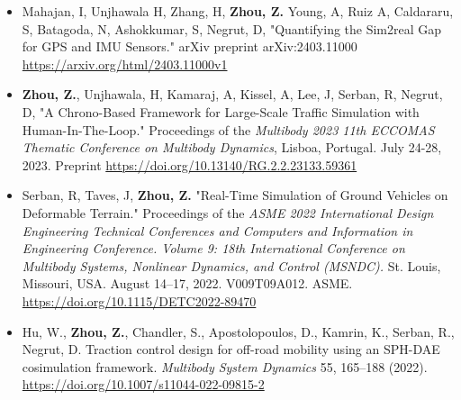 



\begin{footnotesize}

\begin{itemize}[leftmargin=2ex, nosep, noitemsep]
	\item {Mahajan, I, Unjhawala H, Zhang, H, \textbf{Zhou, Z.} Young, A, Ruiz A, Caldararu, S, Batagoda, N, Ashokkumar, S, Negrut, D,  "Quantifying the Sim2real Gap for GPS and IMU Sensors." arXiv preprint arXiv:2403.11000 \url{https://arxiv.org/html/2403.11000v1}}
	
	
	\item {\textbf{Zhou, Z.}, Unjhawala, H, Kamaraj, A, Kissel, A, Lee, J, Serban, R, Negrut, D,  "A Chrono-Based Framework for Large-Scale Traffic Simulation with Human-In-The-Loop." Proceedings of the \textit {Multibody 2023 11th ECCOMAS Thematic Conference on Multibody Dynamics}, Lisboa, Portugal. July 24-28, 2023. Preprint \url{https://doi.org/10.13140/RG.2.2.23133.59361}}
	
	
	\item {Serban, R, Taves, J, \textbf{Zhou, Z.} "Real-Time Simulation of Ground Vehicles on Deformable Terrain." Proceedings of the \textit {ASME 2022 International Design Engineering Technical Conferences and Computers and Information in Engineering Conference. Volume 9: 18th International Conference on Multibody Systems, Nonlinear Dynamics, and Control (MSNDC).} St. Louis, Missouri, USA. August 14–17, 2022. V009T09A012. ASME. \url{https://doi.org/10.1115/DETC2022-89470}}
	
	
	\item {Hu, W., \textbf{Zhou, Z.}, Chandler, S., Apostolopoulos, D., Kamrin, K., Serban, R., Negrut, D. Traction control design for off-road mobility using an SPH-DAE cosimulation framework. \textit {Multibody System Dynamics} 55, 165–188 (2022). \url{https://doi.org/10.1007/s11044-022-09815-2}}
	

\end{itemize}
\end{footnotesize}
